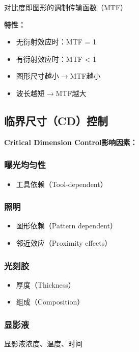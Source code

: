\documentclass[UTF8,12pt,a4paper]{ctexart}
\begin{document}
对比度即图形的调制传输函数（MTF）

\textbf{特性：}
\begin{itemize}
    \item 无衍射效应时：MTF = 1
    \item 有衍射效应时：MTF < 1
    \item 图形尺寸越小$\rightarrow$MTF越小
    \item 波长越短$\rightarrow$MTF越大
\end{itemize}

\subsection{临界尺寸（CD）控制}

\textbf{Critical Dimension Control影响因素：}

\subsubsection{曝光均匀性}

\begin{itemize}
    \item 工具依赖（Tool-dependent）
\end{itemize}

\subsubsection{照明}

\begin{itemize}
    \item 图形依赖（Pattern dependent）
    \item 邻近效应（Proximity effects）
\end{itemize}

\subsubsection{光刻胶}

\begin{itemize}
    \item 厚度（Thickness）
    \item 组成（Composition）
\end{itemize}

\subsubsection{显影液}

显影液浓度、温度、时间
\end{document}
